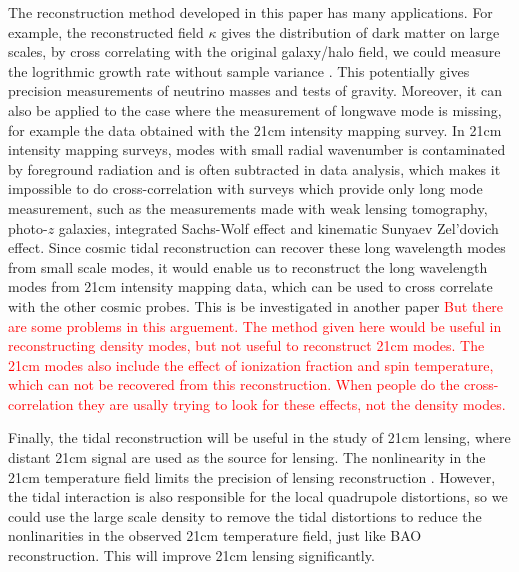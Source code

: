 \documentclass[aps,prd,twocolumn,showpacs,superscriptaddress,groupedaddress,nofootinbib]{revtex4}  %
\begin{document}
The reconstruction method developed in this paper has many applications. 
For example, the reconstructed field $\kappa$ gives the distribution of dark matter
on large scales, by cross correlating with the original galaxy/halo field,
we could measure the logrithmic growth rate without sample variance 
\cite{2009mcdonald}. This potentially gives precision measurements of neutrino
masses and tests of gravity. Moreover, it can also be applied to the case where 
the measurement of longwave mode is missing, for example the 
 data obtained with the 21cm intensity mapping survey.
In 21cm intensity mapping surveys, modes with small radial wavenumber is contaminated 
by foreground radiation and is often subtracted in data analysis,
which makes it impossible to do cross-correlation with surveys which provide only 
long mode measurement, such as the measurements made with weak lensing tomography, 
photo-$z$ galaxies, integrated Sachs-Wolf effect and kinematic Sunyaev Zel'dovich effect.
Since cosmic tidal reconstruction can recover these long wavelength modes from small 
scale modes, it would enable us to reconstruct the long wavelength modes from 21cm intensity mapping data, 
which can be used to  cross correlate with the other cosmic probes. This is be investigated in 
another paper \textcolor{red}{But there are some problems in this arguement. The method given here would 
be useful in reconstructing density modes, but not useful to reconstruct 21cm modes. The 21cm modes also 
include the effect of ionization fraction and spin temperature, which can not be recovered from this reconstruction.
When people do the cross-correlation they are usally trying to look for these effects, not the density modes.} 




Finally, the tidal reconstruction will be useful in the study of 21cm lensing, where distant 
21cm signal are used as the source for lensing.  The nonlinearity in the 21cm temperature 
field limits the precision of lensing reconstruction  \cite{2008:lu,2010lu}. 
However, the tidal interaction is also responsible for the local quadrupole distortions,
so we could use the large scale density to remove the tidal distortions to 
reduce the nonlinarities in the observed 21cm temperature field, just like BAO
reconstruction. This will improve 21cm lensing significantly. 
\end{document}
